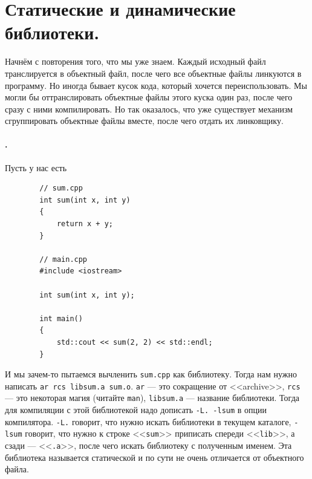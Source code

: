 \documentclass{article}
\begin{document}
    \section{Статические и динамические библиотеки.}
    Начнём с повторения того, что мы уже знаем. Каждый исходный файл транслируется в объектный файл, после чего все объектные файлы линкуются в программу. Но иногда бывает кусок кода, который хочется переиспользовать. Мы могли бы оттранслировать объектные файлы этого куска один раз, после чего сразу с ними компилировать. Но так оказалось, что уже существует механизм сгруппировать объектные файлы вместе, после чего отдать их линковщику.
    \paragraph{.}
    Пусть у нас есть
    \begin{verbatim}
        // sum.cpp
        int sum(int x, int y)
        {
            return x + y;
        }

        // main.cpp
        #include <iostream>

        int sum(int x, int y);

        int main()
        {
            std::cout << sum(2, 2) << std::endl;
        }
    \end{verbatim}
    И мы зачем-то пытаемся вычленить \texttt{sum.cpp} как библиотеку. Тогда нам нужно написать \texttt{ar rcs libsum.a sum.o}. \texttt{ar} --- это сокращение от <<archive>>, \texttt{rcs} --- это некоторая магия (читайте \texttt{man}), \texttt{libsum.a} --- название библиотеки. Тогда для компиляции с этой библиотекой надо дописать \texttt{-L. -lsum} в опции компилятора. \texttt{-L.} говорит, что нужно искать библиотеки в текущем каталоге, \texttt{-lsum} говорит, что нужно к строке <<\texttt{sum}>> приписать спереди <<\texttt{lib}>>, а сзади --- <<\texttt{.a}>>, после чего искать библиотеку с полученным именем. Эта библиотека называется статической и по сути не очень отличается от объектного файла.
\end{document}

